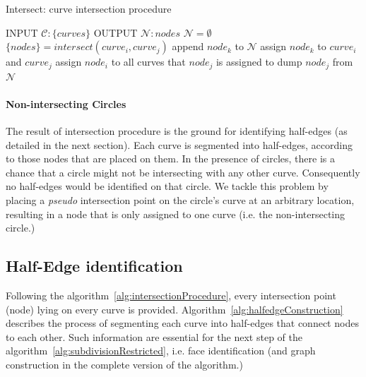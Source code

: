 \begin{algorithm}
  \caption {Intersect: curve intersection procedure}
  \label{alg:intersectionProcedure}
  \begin{algorithmic}    
    \STATE INPUT  $\mathcal{C}:\{curves\}$
    \STATE OUTPUT  $\mathcal{N}:\mathit{nodes}$
    \STATE \quad
    \STATE $\mathcal{N} = \emptyset$
    \STATE $\{nodes\}=intersect\left( curve_i, curve_j \right) $
    \STATE append $node_k$ to $\mathcal{N}$
    \STATE assign $node_k$ to $curve_i$ and $curve_j$
    \ENDFOR
    \ENDFOR
    \STATE \quad
    \STATE assign $node_i$ to all curves that $node_j$ is assigned to
    \STATE dump $node_j$ from $\mathcal{N}$
    \ENDFOR
  \end{algorithmic}
\end{algorithm}

\paragraph{Non-intersecting Circles}
The result of intersection procedure is the ground for identifying half-edges (as detailed in the next section).
Each curve is segmented into half-edges, according to those nodes that are placed on them.
In the presence of circles, there is a chance that a circle might not be intersecting with any other curve.
Consequently no half-edges would be identified on that circle.
We tackle this problem by placing a \emph{pseudo} intersection point on the circle's curve at an arbitrary location, resulting in a node that is only assigned to one curve (i.e. the non-intersecting circle.)

\subsection{Half-Edge identification} \label{subsec:halfEdgeConstruction}

Following the algorithm~\ref{alg:intersectionProcedure}, every intersection point (node) lying on every curve is provided.
Algorithm~\ref{alg:halfedgeConstruction} describes the process of segmenting each curve into half-edges that connect nodes to each other.
Such information are essential for the next step of the algorithm~\ref{alg:subdivisionRestricted}, i.e. face identification (and graph construction in the complete version of the algorithm.)\bigskip

